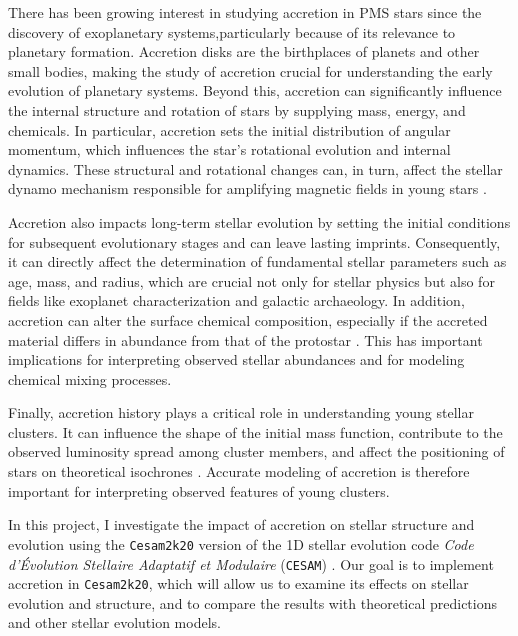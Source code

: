 \documentclass[12pt,a4paper]{article}
\begin{document}
There has been growing interest in studying accretion in PMS stars since the discovery of exoplanetary systems,particularly because of its relevance to planetary formation. Accretion disks are the birthplaces of planets and other small bodies, making the study of accretion crucial for understanding the early evolution of planetary systems. Beyond this, accretion can significantly influence the internal structure and rotation of stars by supplying mass, energy, and chemicals. In particular, accretion sets the initial distribution of angular momentum, which influences the star's rotational evolution and internal dynamics. These structural and rotational changes can, in turn, affect the stellar dynamo mechanism responsible for amplifying magnetic fields in young stars \parencite[e.g.,][]{StelzerNeuhauser2001}. 

Accretion also impacts long-term stellar evolution by setting the initial conditions for subsequent evolutionary stages and can leave lasting imprints. Consequently, it can directly affect the determination of fundamental stellar parameters such as age, mass, and radius, which are crucial not only for stellar physics but also for fields like exoplanet characterization and galactic archaeology. In addition, accretion can alter the surface chemical composition, especially if the accreted material differs in abundance from that of the protostar \parencite{KunitomoGuillot2021}. This has important implications for interpreting observed stellar abundances and for modeling chemical mixing processes.

Finally, accretion history plays a critical role in understanding young stellar clusters. It can influence the shape of the initial mass function, contribute to the observed luminosity spread among cluster members, and affect the positioning of stars on theoretical isochrones \parencite{BaraffeEtAl2009,BaraffeEtAl2012,HosokawaEtAl2011}. Accurate modeling of accretion is therefore important for interpreting observed features of young clusters.

In this project, I investigate the impact of accretion on stellar structure and evolution using the \texttt{Cesam2k20} version of the 1D stellar evolution code \textit{Code d'Évolution Stellaire Adaptatif et Modulaire} (\texttt{CESAM}) \parencite{Morel1997,MorelLebreton2008,MarquesEtAl2013}. Our goal is to implement accretion in \texttt{Cesam2k20}, which will allow us to examine its effects on stellar evolution and structure, and to compare the results with theoretical predictions and other stellar evolution models.
\end{document}
